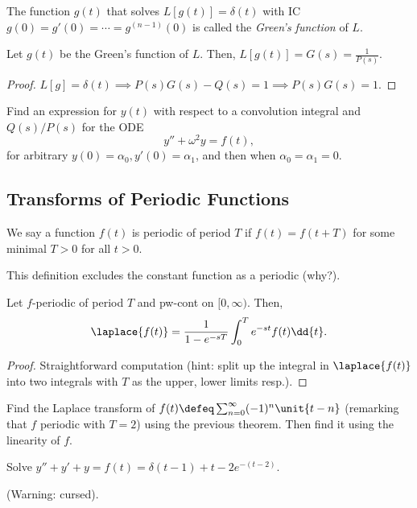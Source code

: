 \begin{definition}
    The function $g(t)$ that solves $L[g(t)] = \delta(t)$ with IC $g(0) = g'(0) = \cdots = g^{(n-1)}(0)$ is called the \emph{Green's function} of $L$.
\end{definition}

\begin{theorem}
    Let $g(t)$ be the Green's function of $L$. Then, $L[g(t)] = G(s) = \frac{1}{P(s)}$.
\end{theorem}

\begin{proof}
    $L[g] = \delta(t) \implies P(s)G(s) - Q(s) = 1 \implies P(s)G(s) = 1$.
\end{proof}

\begin{example}
    Find an expression for $y(t)$ with respect to a convolution integral and $Q(s)/P(s)$ for the ODE\[
    y'' + \omega^2 y = f(t), 
    \]
    for arbitrary $y(0) =\alpha_0, y'(0) = \alpha_1$, and then when $\alpha_0 = \alpha_1 = 0$.
\end{example}

\subsection{Transforms of Periodic Functions}

\begin{definition}
    We say a function $f(t)$ is periodic of period $T$ if $f(t) = f(t + T)$ for some minimal $T > 0$ for all $t > 0$.
\end{definition}
\begin{remark}
    This definition excludes the constant function as a periodic (why?).
\end{remark}

\begin{theorem}
    Let $f$-periodic of period $T$ and pw-cont on $[0, \infty)$. Then, \[
    \laplace{f(t)}     = \frac{1}{1 - e^{-sT}}\int_0^T e^{-st} f(t)\dd{t}.
    \]
\end{theorem}

\begin{proof}
    Straightforward computation (hint: split up the integral in $\laplace{f(t)}$ into two integrals with $T$ as the upper, lower limits resp.).
\end{proof}

\begin{example}
    Find the Laplace transform of $f(t) \defeq \sum_{n=0}^\infty (-1)^n \unit{t - n}$ (remarking that $f$ periodic with $T = 2$) using the previous theorem. Then find it using the linearity of $f$.
\end{example}

\begin{example}
    Solve $y'' + y' + y = f(t) = \delta(t - 1) + \unit{t - 2}e^{-(t-2)}$.

    (Warning: cursed).
\end{example}
